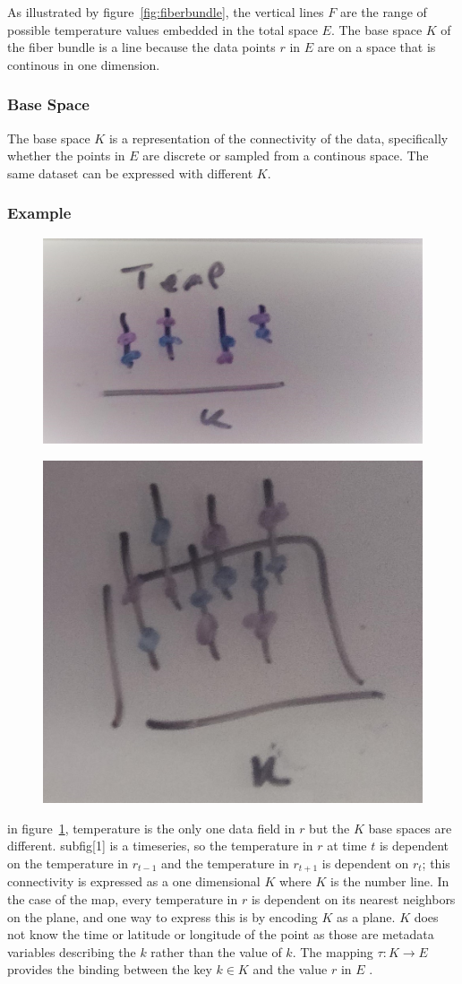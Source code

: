 \documentclass[../main.tex]{subfiles}
\begin{document}
As illustrated by figure~\ref{fig:fiberbundle}, the vertical lines $F$ are the range of possible temperature values embedded in the total space $E$. The base space $K$ of the fiber bundle is a line because the data points $r$ in $E$ are on a space that is  continous in one dimension. 

\subsubsection{Base Space}
The base space $K$ is a representation of the connectivity of the data, specifically whether the points in $E$ are discrete or sampled from a continous space. The same dataset can be expressed with different $K$. 

\subsubsection{Example}
\begin{figure}[ht]
    \includegraphics[width=0.2\linewidth]{figures/sections/math/temp_1k.png}
    \label{fig:k_data}
\end{figure}

\begin{figure}[ht]
    \includegraphics[width=0.2\linewidth]{figures/sections/math/temp_2k.png}
\end{figure}

in figure~\ref{fig:k_data}, temperature is the only one data field in $r$ but the $K$ base spaces are different. subfig[1] is a timeseries, so the temperature in $r$ at time $t$ is dependent on the temperature in $r_{t-1}$ and the temperature in $r_{t+1}$ is dependent on  $r_t$; this connectivity is expressed as a one dimensional $K$ where $K$ is the number line. In the case of the map, every temperature in $r$ is dependent on its nearest neighbors on the plane, and one way to express this is by encoding $K$ as a plane. $K$ does not know the time or latitude or longitude of the point as those are metadata variables describing the $k$ rather than the value of $k$. The mapping $\tau: K \rightarrow E$ provides the binding between the key $k \in K$ and the value $r$ in $E$ \cite{munznerChDataAbstraction}.
\end{document}
